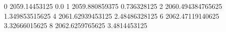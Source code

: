 0 2059.14453125 0.0
1 2059.880859375 0.736328125
2 2060.494384765625 1.349853515625
4 2061.62939453125 2.48486328125
6 2062.47119140625 3.32666015625
8 2062.6259765625 3.4814453125
